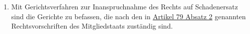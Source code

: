\begin{enumerate}
  \item Mit Gerichtsverfahren zur Inanspruchnahme des Rechts auf Schadenersatz sind die Gerichte zu befassen, die nach
   den in \hyperref[itm:79-2]{Artikel 79 Absatz 2} genannten Rechtsvorschriften des Mitgliedstaats zuständig sind.
  \label{itm:82-6}

\end{enumerate}


